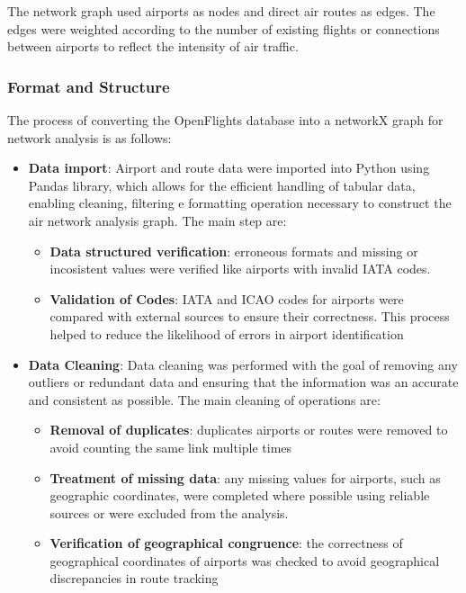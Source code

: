 \documentclass[12pt]{article}
\begin{document}
    The network graph used airports as nodes and direct air routes as edges. The edges were weighted according to the number of existing flights or connections between airports to reflect the intensity of air traffic.

    \subsubsection{Format and Structure}
    The process of converting the OpenFlights database into a networkX graph for network analysis is as follows:
    \begin{itemize}
        \item \textbf{Data import}: Airport and route data were imported into Python using Pandas library, which allows for the efficient handling of tabular data, enabling cleaning, filtering e formatting operation necessary to construct the air network analysis graph.
        The main step are:
             \begin{itemize}
                 \item \textbf{Data structured verification}: erroneous formats and missing or incosistent values were verified like airports with invalid IATA codes.
                 \item \textbf{Validation of Codes}: IATA and ICAO codes for airports were compared with external sources to ensure their correctness. This process helped to reduce the likelihood of errors in airport identification
             \end{itemize}
        \item \textbf{Data Cleaning}: Data cleaning was performed with the goal of removing any outliers or redundant data and ensuring that the information was an accurate and consistent as possible.
        The main cleaning of operations are:
            \begin{itemize}
                \item \textbf{Removal of duplicates}: duplicates airports or routes were removed to avoid counting the same link multiple times
                \item  \textbf{Treatment of missing data}: any missing values for airports, such as geographic coordinates, were completed where possible using reliable sources or were excluded from the analysis.
                \item \textbf{Verification of geographical congruence}: the correctness of geographical coordinates of airports was checked to avoid geographical discrepancies in route tracking

\end{itemize}
\end{itemize}
\end{document}
